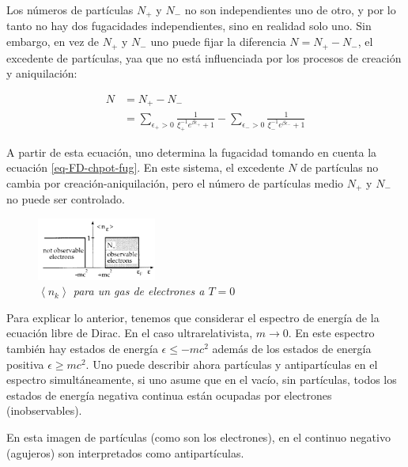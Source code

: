 Los números de partículas ${N}_{+}$ y ${N}_{-}$ no son independientes uno de otro, y por lo tanto no hay dos fugacidades independientes, sino en realidad solo uno. Sin embargo, en vez de ${N}_{+}$ y ${N}_{-}$ uno puede fijar la diferencia $N = {N}_{+} - {N}_{-}$, el excedente de partículas, yaa que no está influenciada por los procesos de creación y aniquilación:

\begin{equation}\label{eq-FD-ExcedenteNumParts}
\begin{split}
N & = {N}_{+} - {N}_{-} \\
& = \sum_{{\epsilon}_{+} > 0} \frac{1}{{\xi}_{+}^{-1}{e}^{\beta{{\epsilon}}_{+}} + 1} -\sum_{{\epsilon}_{-} > 0} \frac{1}{{\xi}_{-}^{-1}{e}^{\beta{{\epsilon}}_{-}} + 1}
\end{split}
\end{equation}

A partir de esta ecuación, uno determina la fugacidad tomando en cuenta la ecuación \eqref{eq-FD-chpot-fug}. En este sistema, el excedente $N$ de partículas no cambia por creación-aniquilación, pero el número de partículas medio ${N}_{+}$ y ${N}_{-}$ no puede ser controlado.

\begin{figure}
\centering
\includegraphics[width=0.35\textwidth]{./Images/ParticleNumberGaswithTnull.png}
\caption[Número de partículas para un gas de electrones a $T=0$]{\emph{$\left\langle {n}_{k} \right\rangle$ para un gas de electrones a $T=0$}}
\label{fig: Gas de electrones}
\end{figure}

Para explicar lo anterior, tenemos que considerar el espectro de energía de la ecuación libre de Dirac. En el caso ultrarelativista, $m \rightarrow 0$. En este espectro también hay estados de energía $\epsilon \leq -m {c}^{2}$ además de los estados de energía positiva $\epsilon \geq m{c}^{2}$. Uno puede describir ahora partículas y antipartículas en el espectro simultáneamente, si uno asume que en el vacío, sin partículas, todos los estados de energía negativa continua están ocupadas por electrones (inobservables).

En esta imagen de partículas (como son los electrones), en el continuo negativo (agujeros) son interpretados como antipartículas.

